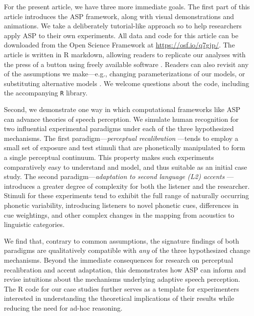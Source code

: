 \documentclass[
  11pt,
  man,floatsintext]{apa6}
\begin{document}
For the present article, we have three more immediate goals. The first part of this article introduces the ASP framework, along with visual demonstrations and animations. We take a deliberately tutorial-like approach so to help researchers apply ASP to their own experiments. All data and code for this article can be downloaded from the Open Science Framework at \url{https://osf.io/q7gjp/}. The article is written in R markdown, allowing readers to replicate our analyses with the press of a button using freely available software \autocites{R}[see supplementary information for detailed software requirements]{RStudio}. Readers can also revisit any of the assumptions we make---e.g., changing parameterizations of our models, or substituting alternative models \autocite[see also][]{tan2021}. We welcome questions about the code, including the accompanying \texttt{R} library.

Second, we demonstrate one way in which computational frameworks like ASP can advance theories of speech perception. We simulate human recognition for two influential experimental paradigms under each of the three hypothesized mechanisms. The first paradigm---\emph{perceptual recalibration} \autocites[e.g.,][]{kraljic-samuel2006,reinisch-holt2013,samuel2016,vroomen-baart2009}---tends to employ a small set of exposure and test stimuli that are phonetically manipulated to form a single perceptual continuum. This property makes such experiments comparatively easy to understand and model, and thus suitable as an initial case study. The second paradigm---\emph{adaptation to second language (L2) accents} \autocites[e.g.,][]{bradlow-bent2008,hernandez2019,tzeng2016,sidaras2009,xie2016jep,zheng-samuel2020}---introduces a greater degree of complexity for both the listener and the researcher. Stimuli for these experiments tend to exhibit the full range of naturally occurring phonetic variability, introducing listeners to novel phonetic cues, differences in cue weightings, and other complex changes in the mapping from acoustics to linguistic categories.

We find that, contrary to common assumptions, the signature findings of both paradigms are qualitatively compatible with \emph{any} of the three hypothesized change mechanisms. Beyond the immediate consequences for research on perceptual recalibration and accent adaptation, this demonstrates how ASP can inform and revise intuitions about the mechanisms underlying adaptive speech perception. The R code for our case studies further serves as a template for experimenters interested in understanding the theoretical implications of their results while reducing the need for ad-hoc reasoning.
\end{document}
